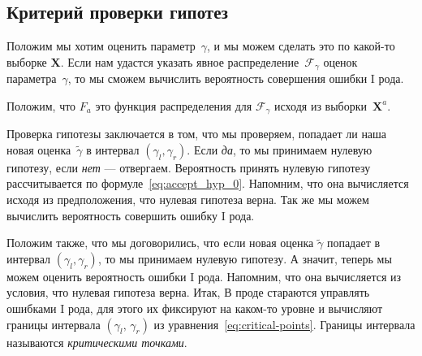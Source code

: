 \documentclass[../handbook.tex]{subfiles}
\begin{document}
\subsection{Критерий проверки гипотез}
Положим мы хотим оценить параметр~$\gamma$, и мы можем сделать это по какой-то
выборке $\mathbf{X}$. Если нам удастся указать явное распределение~$\mathcal
F_\gamma$ оценок параметра~$\gamma$, то мы сможем вычислить вероятность совершения ошибки I рода.

Положим, что $F_a$ это функция распределения для $\mathcal F_\gamma$ исходя
из выборки~$\mathbf X^a$.

Проверка гипотезы заключается в том, что мы проверяем, попадает ли наша новая
оценка~$\tilde\gamma$ в интервал $(\gamma_l, \gamma_r)$. Если \emph{да}, то мы
принимаем нулевую гипотезу, если \emph{нет} --- отвергаем. Вероятность принять нулевую гипотезу рассчитывается по формуле~\eqref{eq:accept_hyp_0}. Напомним, что она вычисляется исходя из предположения, что нулевая гипотеза верна. Так же мы можем вычислить вероятность совершить ошибку I рода. 

Положим также, что мы договорились, что если новая
оценка $\tilde \gamma$ попадает в интервал $(\gamma_l, \gamma_r)$, то мы
принимаем нулевую гипотезу. А значит, теперь мы можем оценить вероятность
ошибки I рода. Напомним, что она вычисляется из условия, что нулевая гипотеза
верна. Итак,
В проде стараются управлять ошибками I рода, для этого их фиксируют на каком-то
уровне и вычисляют границы интервала $(\gamma_l,\, \gamma_r)$ из
уравнения~\eqref{eq:critical-points}. Границы интервала называются
\emph{критическими точками}.
\end{document}
